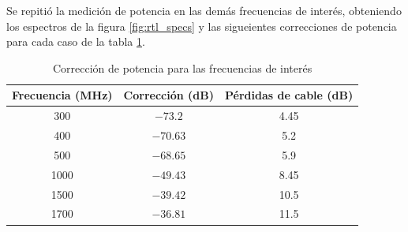Se repitió la medición de potencia en las demás frecuencias de interés, obteniendo los espectros de la figura \ref{fig:rtl_specs} y las sigueientes correcciones de potencia para cada caso de la tabla \ref{tab:correccion}.\\

\begin{table}
    \centering
    \begin{tabular}{|c|c|c|}
        \hline
        Frecuencia (MHz) & Corrección (dB) & Pérdidas de cable (dB)\\
        \hline
        300 & $-73.2$ & 4.45\\
        400 & $-70.63$ & 5.2\\
        500 & $-68.65$ & 5.9\\
        1000 & $-49.43$ & 8.45\\
        1500 & $-39.42$ & 10.5\\
        1700 & $-36.81$ & 11.5\\
        \hline
    \end{tabular}
    \caption{Corrección de potencia para las frecuencias de interés}
    \label{tab:correccion}
\end{table}



